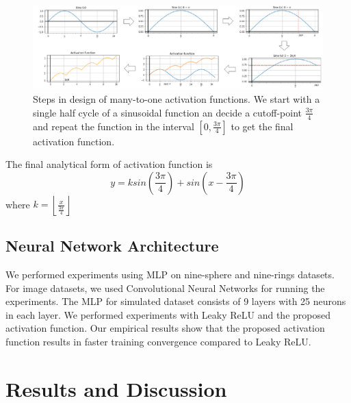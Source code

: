\documentclass[wcp]{jmlr}
\begin{document}
\begin{figure}[htp]
\begin{center}
\includegraphics[width=\textwidth]{images/activation_function_design.png}
\caption{Steps in design of many-to-one activation functions. We start with a single half cycle of a sinusoidal function an decide a cutoff-point $\frac{3\pi}{4}$ and repeat the function in the interval $[0,\frac{3\pi}{4}]$ to get the final activation function.}
\label{fig:activation_function_design}
\end{center}
\end{figure}

The final analytical form of activation function is
\begin{equation}
y = ksin(\frac{3\pi}{4})   + sin(x - \frac{3\pi}{4})
\end{equation}
 where $k=\left \lfloor{\frac{x}{\frac{3\pi}{4}}}\right \rfloor$

\subsection{Neural Network Architecture}
We performed experiments using MLP  on nine-sphere and nine-rings datasets. For image datasets, we used Convolutional Neural Networks for running the experiments. The MLP for simulated dataset consists of 9 layers with 25 neurons in each layer. We performed experiments with Leaky ReLU and the proposed activation function. Our empirical results show that the proposed activation function results in faster training convergence compared to Leaky ReLU.

\section{Results and Discussion}
\end{document}

